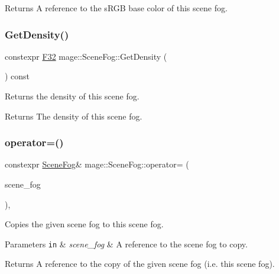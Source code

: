 \begin{DoxyReturn}{Returns}
A reference to the s\+R\+GB base color of this scene fog. 
\end{DoxyReturn}
\hypertarget{classmage_1_1_scene_fog_a25f35f02f71503656e7eaeeb9fdbfde4}{}\label{classmage_1_1_scene_fog_a25f35f02f71503656e7eaeeb9fdbfde4} 
\subsubsection{\texorpdfstring{Get\+Density()}{GetDensity()}}
{\footnotesize\ttfamily constexpr \hyperlink{namespacemage_aa97e833b45f06d60a0a9c4fc22ae02c0}{F32} mage\+::\+Scene\+Fog\+::\+Get\+Density (\begin{DoxyParamCaption}{ }\end{DoxyParamCaption}) const\hspace{0.3cm}{\ttfamily [noexcept]}}

Returns the density of this scene fog.

\begin{DoxyReturn}{Returns}
The density of this scene fog. 
\end{DoxyReturn}
\hypertarget{classmage_1_1_scene_fog_aab29517edb102040e5e4a1c5bad418b8}{}\label{classmage_1_1_scene_fog_aab29517edb102040e5e4a1c5bad418b8} 
\subsubsection{\texorpdfstring{operator=()}{operator=()}\hspace{0.1cm}{\footnotesize\ttfamily [1/2]}}
{\footnotesize\ttfamily constexpr \hyperlink{classmage_1_1_scene_fog}{Scene\+Fog}\& mage\+::\+Scene\+Fog\+::operator= (\begin{DoxyParamCaption}\item[{const \hyperlink{classmage_1_1_scene_fog}{Scene\+Fog} \&}]{scene\+\_\+fog }\end{DoxyParamCaption})\hspace{0.3cm}{\ttfamily [default]}, {\ttfamily [noexcept]}}

Copies the given scene fog to this scene fog.


\begin{DoxyParams}[1]{Parameters}
\mbox{\tt in}  & {\em scene\+\_\+fog} & A reference to the scene fog to copy. \\
\hline
\end{DoxyParams}
\begin{DoxyReturn}{Returns}
A reference to the copy of the given scene fog (i.\+e. this scene fog). 
\end{DoxyReturn}
\hypertarget{classmage_1_1_scene_fog_a2b673372d2dea718361cb5a84454e7e0}{}\label{classmage_1_1_scene_fog_a2b673372d2dea718361cb5a84454e7e0} 

